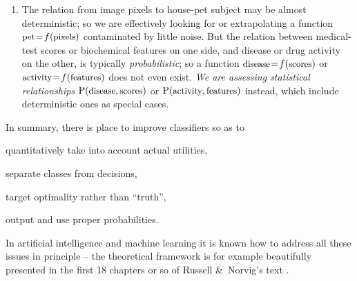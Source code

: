 \documentclass[\ifafour a4paper,12pt,\else a5paper,10pt,\fi%
onecolumn,oneside,article,%
british%
]{memoir}
\theoremstyle{remark}
\theoremstyle{innote}
\newcommand*{\amp}{\&}
\renewcommand*{\P}{\mathrm{P}}%
\renewcommand*{\|}[1][]{\nonscript\:#1\vert\nonscript\:\mathopen{}}
\newcommand*{\mo}[1][=]{\mathrel{\mkern-3.5mu#1\mkern-3.5mu}}
\newcommand*{\texts}[1]{\text{\small #1}}
\begin{document}
\begin{enumerate}[label=(\roman*)]
  
\item\label{item:determ_statist} The relation from image pixels to house-pet subject may be almost deterministic; so we are effectively looking for or extrapolating a function $\texts{pet} \mo f(\texts{pixels})$ contaminated by little noise. But the relation between medical-test scores or biochemical features on one side, and disease or drug activity on the other, is typically \emph{probabilistic}; so a function $\texts{disease} \mo f(\texts{scores})$
  or $\texts{activity} \mo f(\texts{features})$
  does not even exist. \emph{We are assessing statistical relationships} $\P(\texts{disease} , \texts{scores})$ or $\P(\texts{activity} , \texts{features})$ instead, which include deterministic ones as special cases.

\end{enumerate}

In summary, there is place to improve classifiers so as to
\begin{enumerate*}[label=(\roman*)]
\item quantitatively take into account actual utilities,
\item separate classes from decisions,
\item target optimality rather than \enquote{truth}, %
\item output and use proper probabilities.
\end{enumerate*}

\medskip

In artificial intelligence and machine learning it is known how to address all these issues in principle -- the theoretical framework is for example beautifully presented in the first 18 chapters or so of Russell \amp\ Norvig's \cites*{russelletal1995_r2022} text \autocites[see also][]{selfetal1987,cheeseman1988,cheeseman1995_r2018,pearl1988,mackay1995_r2005}.
\end{document}

